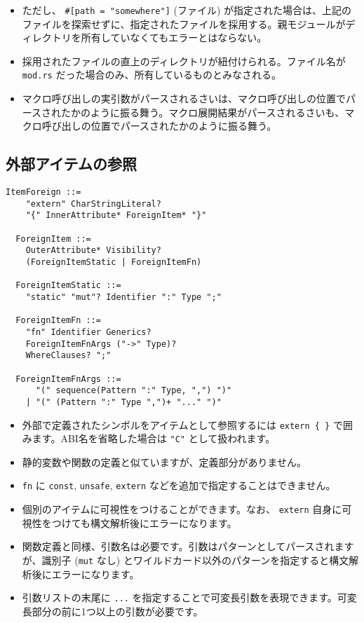 \documentclass[dvipdfmx,uplatex,papersize,a4paper,10pt]{jsbook}
\theoremstyle{definition}
\begin{document}
\begin{itemize}
\begin{itemize}
      \item ただし、 \verb|#[path = "somewhere"]| (ファイル) が指定された場合は、上記のファイルを探索せずに、指定されたファイルを採用する。親モジュールがディレクトリを所有していなくてもエラーとはならない。
      \item 採用されたファイルの直上のディレクトリが紐付けられる。ファイル名が \verb|mod.rs| だった場合のみ、所有しているものとみなされる。
      \item マクロ呼び出しの実引数がパースされるさいは、マクロ呼び出しの位置でパースされたかのように振る舞う。マクロ展開結果がパースされるさいも、マクロ呼び出しの位置でパースされたかのように振る舞う。
    \end{itemize}
\end{itemize}

\subsection{外部アイテムの参照}

\begin{lstlisting}[language=BNFLike, gobble=2]
  ItemForeign ::=
    "extern" CharStringLiteral?
    "{" InnerAttribute* ForeignItem* "}"

  ForeignItem ::=
    OuterAttribute* Visibility?
    (ForeignItemStatic | ForeignItemFn)

  ForeignItemStatic ::=
    "static" "mut"? Identifier ":" Type ";"

  ForeignItemFn ::=
    "fn" Identifier Generics?
    ForeignItemFnArgs ("->" Type)?
    WhereClauses? ";"

  ForeignItemFnArgs ::=
      "(" sequence(Pattern ":" Type, ",") ")"
    | "(" (Pattern ":" Type ",")+ "..." ")"
\end{lstlisting}

\begin{itemize}
  \item 外部で定義されたシンボルをアイテムとして参照するには \verb|extern { }| で囲みます。ABI名を省略した場合は \verb|"C"| として扱われます。
  \item 静的変数や関数の定義と似ていますが、定義部分がありません。
  \item \verb|fn| に \verb|const|, \verb|unsafe|, \verb|extern| などを追加で指定することはできません。
  \item 個別のアイテムに可視性をつけることができます。なお、 \verb|extern| 自身に可視性をつけても構文解析後にエラーになります。
  \item 関数定義と同様、引数名は必要です。引数はパターンとしてパースされますが、識別子 (\verb|mut| なし) とワイルドカード以外のパターンを指定すると構文解析後にエラーになります。
  \item 引数リストの末尾に \verb|...| を指定することで可変長引数を表現できます。可変長部分の前に1つ以上の引数が必要です。
\end{itemize}
\end{document}
